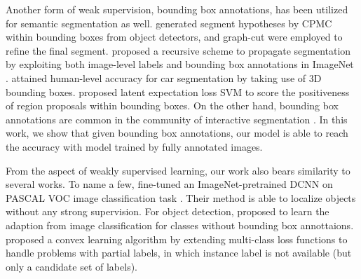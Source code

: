 Another form of weak supervision, bounding box annotations, has been utilized for semantic segmentation as well. \citet{xia2013semantic} generated segment hypotheses by CPMC \citep{carreira2012cpmc} within bounding boxes from object detectors, and graph-cut were employed to refine the final segment. \citet{guillaumin2014imagenet} proposed a recursive scheme to propagate segmentation by exploiting both image-level labels and bounding box annotations in ImageNet \citep{deng2009imagenet}. \citet{chen2014beat} attained human-level accuracy for car segmentation by taking use of 3D bounding boxes. \citet{zhu2014learning} proposed latent expectation loss SVM to score the positiveness of region proposals within bounding boxes. On the other hand, bounding box annotations are common in the community of interactive segmentation \citep{lempitsky2009image, rother2004grabcut, WuMilcut}. In this work, we show that given bounding box annotations, our model is able to reach the accuracy with model trained by fully annotated images.

From the aspect of weakly supervised learning, our work also bears similarity to several works. To name a few, \citet{oquab2014weakly} fine-tuned an ImageNet-pretrained DCNN on PASCAL VOC image classification task \citep{everingham2014pascal}. Their method is able to localize objects without any strong supervision. For object detection, \citet{Hoffman14Lsda} proposed to learn the adaption from image classification for classes without bounding box annottaions. \citet{cour2011learning} proposed a convex learning algorithm by extending multi-class loss functions to handle problems with partial labels, in which instance label is not available (but only a candidate set of labels).
